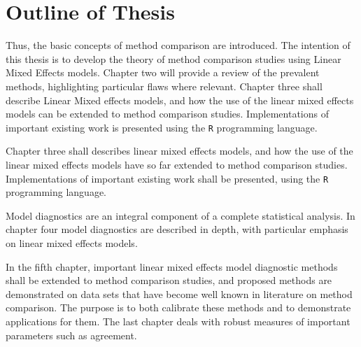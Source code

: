 \documentclass[12pt, a4paper]{report}
\theoremstyle{plain}
\theoremstyle{definition}
\theoremstyle{remark}
\begin{document}
	
	
	
	
	
	
	\section{Outline of Thesis}
	Thus, the basic concepts of method comparison are introduced. The intention of this thesis is to develop the theory of method comparison studies using Linear Mixed Effects models. Chapter two will provide a review of the prevalent methods, highlighting particular flaws where relevant. Chapter three shall describe Linear Mixed effects models, and how the use of the linear mixed
	effects models can be extended to method comparison studies. Implementations of important existing work is presented using the \texttt{R} programming language.
	
	
	
	Chapter three shall describes linear mixed effects models, and how the use of the linear mixed effects models have so far extended to method comparison studies. Implementations of important existing work shall be presented, using the \texttt{R} programming language.
	
	Model diagnostics are an integral component of a complete statistical analysis.
	In chapter four model diagnostics are described in depth, with particular
	emphasis on linear mixed effects models.
	
	In the fifth chapter, important linear mixed effects model diagnostic methods shall be extended to method comparison studies, and proposed methods are demonstrated on data sets that have become well known in literature on method comparison. The purpose is to both calibrate these methods and to demonstrate applications for them.
	The last chapter deals with robust measures of important parameters such as agreement.
	
	
	
\end{document}
